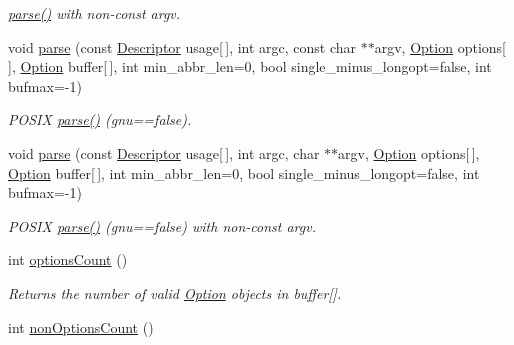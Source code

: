 \begin{DoxyCompactItemize}
\begin{DoxyCompactList}\small\item\em \hyperlink{classoption_1_1Parser_a6e0b5778d1cfbd6cd51240e74d01e138}{parse()} with non-\/const argv. \end{DoxyCompactList}\item 
\mbox{\label{classoption_1_1Parser_a41885a7308249c8532714e15b36106bd}} 
void \hyperlink{classoption_1_1Parser_a41885a7308249c8532714e15b36106bd}{parse} (const \hyperlink{structoption_1_1Descriptor}{Descriptor} usage\mbox{[}$\,$\mbox{]}, int argc, const char $\ast$$\ast$argv, \hyperlink{classoption_1_1Option}{Option} options\mbox{[}$\,$\mbox{]}, \hyperlink{classoption_1_1Option}{Option} buffer\mbox{[}$\,$\mbox{]}, int min\+\_\+abbr\+\_\+len=0, bool single\+\_\+minus\+\_\+longopt=false, int bufmax=-\/1)
\begin{DoxyCompactList}\small\item\em P\+O\+S\+IX \hyperlink{classoption_1_1Parser_a6e0b5778d1cfbd6cd51240e74d01e138}{parse()} (gnu==false). \end{DoxyCompactList}\item 
\mbox{\label{classoption_1_1Parser_ad40585faa23a97a186cf9a45b8c2b42b}} 
void \hyperlink{classoption_1_1Parser_ad40585faa23a97a186cf9a45b8c2b42b}{parse} (const \hyperlink{structoption_1_1Descriptor}{Descriptor} usage\mbox{[}$\,$\mbox{]}, int argc, char $\ast$$\ast$argv, \hyperlink{classoption_1_1Option}{Option} options\mbox{[}$\,$\mbox{]}, \hyperlink{classoption_1_1Option}{Option} buffer\mbox{[}$\,$\mbox{]}, int min\+\_\+abbr\+\_\+len=0, bool single\+\_\+minus\+\_\+longopt=false, int bufmax=-\/1)
\begin{DoxyCompactList}\small\item\em P\+O\+S\+IX \hyperlink{classoption_1_1Parser_a6e0b5778d1cfbd6cd51240e74d01e138}{parse()} (gnu==false) with non-\/const argv. \end{DoxyCompactList}\item 
int \hyperlink{classoption_1_1Parser_aee62badd2a19a5b88cbc4a9b11813b82}{options\+Count} ()
\begin{DoxyCompactList}\small\item\em Returns the number of valid \hyperlink{classoption_1_1Option}{Option} objects in {\ttfamily buffer}\mbox{[}\mbox{]}. \end{DoxyCompactList}\item 
int \hyperlink{classoption_1_1Parser_aa64a6a7c196993a1b20d48e8ddd12a34}{non\+Options\+Count} ()

\end{DoxyCompactItemize}
